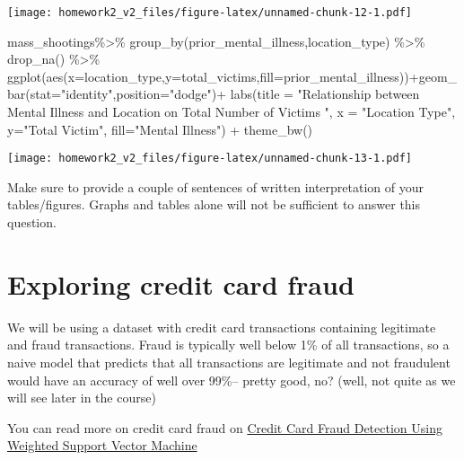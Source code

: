 \documentclass[
]{article}
\newenvironment{Shaded}{\begin{snugshade}}{\end{snugshade}}
\newcommand{\AttributeTok}[1]{\textcolor[rgb]{0.77,0.63,0.00}{#1}}
\newcommand{\FunctionTok}[1]{\textcolor[rgb]{0.00,0.00,0.00}{#1}}
\newcommand{\NormalTok}[1]{#1}
\newcommand{\SpecialCharTok}[1]{\textcolor[rgb]{0.00,0.00,0.00}{#1}}
\newcommand{\StringTok}[1]{\textcolor[rgb]{0.31,0.60,0.02}{#1}}
\begin{document}
\texttt{[image: homework2\_v2\_files/figure-latex/unnamed-chunk-12-1.pdf]}

\begin{Shaded}
\begin{Highlighting}[]
\NormalTok{mass\_shootings}\SpecialCharTok{\%\textgreater{}\%} 
 \FunctionTok{group\_by}\NormalTok{(prior\_mental\_illness,location\_type) }\SpecialCharTok{\%\textgreater{}\%} 
  \FunctionTok{drop\_na}\NormalTok{() }\SpecialCharTok{\%\textgreater{}\%} 
  \FunctionTok{ggplot}\NormalTok{(}\FunctionTok{aes}\NormalTok{(}\AttributeTok{x=}\NormalTok{location\_type,}\AttributeTok{y=}\NormalTok{total\_victims,}\AttributeTok{fill=}\NormalTok{prior\_mental\_illness))}\SpecialCharTok{+}\FunctionTok{geom\_bar}\NormalTok{(}\AttributeTok{stat=}\StringTok{"identity"}\NormalTok{,}\AttributeTok{position=}\StringTok{"dodge"}\NormalTok{)}\SpecialCharTok{+}
\FunctionTok{labs}\NormalTok{(}\AttributeTok{title =} \StringTok{"Relationship between Mental Illness and Location on Total Number of Victims  "}\NormalTok{,}
       \AttributeTok{x =} \StringTok{"Location Type"}\NormalTok{, }\AttributeTok{y=}\StringTok{"Total Victim"}\NormalTok{, }\AttributeTok{fill=}\StringTok{"Mental Illness"}\NormalTok{) }\SpecialCharTok{+}
  \FunctionTok{theme\_bw}\NormalTok{()}
\end{Highlighting}
\end{Shaded}

\texttt{[image: homework2\_v2\_files/figure-latex/unnamed-chunk-13-1.pdf]}

Make sure to provide a couple of sentences of written interpretation of
your tables/figures. Graphs and tables alone will not be sufficient to
answer this question.

\hypertarget{exploring-credit-card-fraud}{%
\section{Exploring credit card
fraud}\label{exploring-credit-card-fraud}}

We will be using a dataset with credit card transactions containing
legitimate and fraud transactions. Fraud is typically well below 1\% of
all transactions, so a naive model that predicts that all transactions
are legitimate and not fraudulent would have an accuracy of well over
99\%-- pretty good, no? (well, not quite as we will see later in the
course)

You can read more on credit card fraud on
\href{https://www.scirp.org/journal/paperinformation.aspx?paperid=105944}{Credit
Card Fraud Detection Using Weighted Support Vector Machine}
\end{document}
